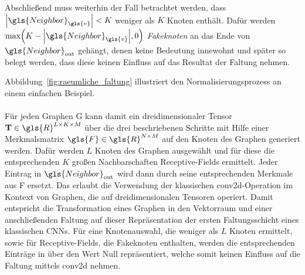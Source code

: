 Abschließend muss weiterhin der Fall betrachtet werden, dass $\left|\gls{Neighbor}_{\gls{v}}\right| < K$ weniger als $K$ Knoten enthält.
Dafür werden $\max\left(K - \left|\gls{Neighbor}_{\gls{v}}\right|, 0\right)$ \emph{Fakeknoten} an das Ende von $\gls{Neighbor}_{\mathrm{out}}$ gehängt, denen keine Bedeutung innewohnt und später so belegt werden, dass diese keinen Einfluss auf das Resultat der Faltung nehmen.

Abbildung~\ref{fig:raeumliche_faltung} illustriert den Normalisierungsprozess an einem einfachen Beispiel.
\\\\
Für jeden Graphen \gls{G} kann damit ein dreidimensionaler Tensor $\ma{T} \in \gls{R}^{L \times K \times M}$ über die drei beschriebenen Schritte mit Hilfe einer Merkmalsmatrix $\gls{F} \in \gls{R}^{N \times M}$ auf den Knoten des Graphen generiert werden.
Dafür werden $L$ Knoten des Graphen ausgewählt und für diese die entsprechenden $K$ großen Nachbarschaften \bzw{} Receptive-Fields ermittelt.
Jeder Eintrag in $\gls{Neighbor}_{\mathrm{out}}$ wird dann durch seine entsprechenden Merkmale aus \gls{F} ersetzt.
Das erlaubt die Verwendung der klassischen \gls{conv2d}-Operation im Kontext von Graphen, die auf dreidimensionalen Tensoren operiert.
Damit entspricht die Transformation eines Graphen in den Vektorraum und einer anschließenden Faltung auf dieser Repräsentation der ersten Faltungsschicht eines klassischen \glspl{CNN}.
Für eine Knotenauswahl, die weniger als $L$ Knoten ermittelt, sowie für Receptive-Fields, die Fakeknoten enthalten, werden die entsprechenden Einträge in  über den Wert Null repräsentiert, welche somit keinen Einfluss auf die Faltung mittels \gls{conv2d} nehmen.
